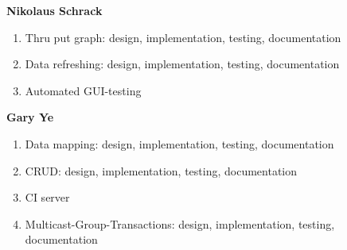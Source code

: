 \documentclass[11pt, a4paper]{article}
\begin{document}
\textbf{Nikolaus Schrack}
\begin{enumerate}[noitemsep]
	\item Thru put graph: design, implementation, testing, documentation
	\item Data refreshing: design, implementation, testing, documentation
	\item Automated GUI-testing
\end{enumerate}

\textbf{Gary Ye}
\begin{enumerate}[noitemsep]
	\item Data mapping: design, implementation, testing, documentation
	\item CRUD: design, implementation, testing, documentation
	\item CI server
	\item Multicast-Group-Transactions: design, implementation, testing, documentation
\end{enumerate}
\end{document}
